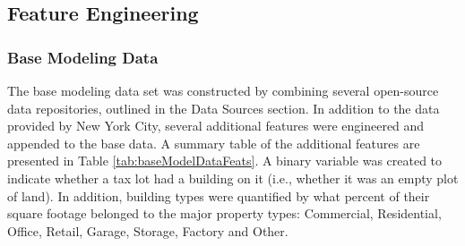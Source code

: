 \documentclass[12pt,]{article}
\begin{document}
\hypertarget{feature-engineering}{%
\subsection{Feature Engineering}\label{feature-engineering}}

\hypertarget{base-modeling-data}{%
\subsubsection{Base Modeling Data}\label{base-modeling-data}}

The base modeling data set was constructed by combining several
open-source data repositories, outlined in the Data Sources section. In
addition to the data provided by New York City, several additional
features were engineered and appended to the base data. A summary table
of the additional features are presented in Table
\ref{tab:baseModelDataFeats}. A binary variable was created to indicate
whether a tax lot had a building on it (i.e., whether it was an empty
plot of land). In addition, building types were quantified by what
percent of their square footage belonged to the major property types:
Commercial, Residential, Office, Retail, Garage, Storage, Factory and
Other.
\end{document}

